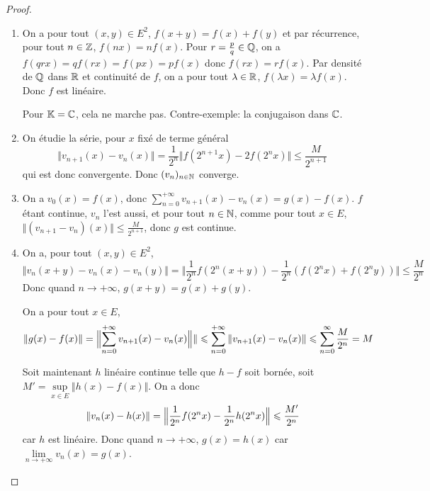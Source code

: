 \begin{proof}
	\phantom{}
	\begin{enumerate}
		\item On a pour tout $(x,y)\in E^{2}$, $f(x+y)=f(x)+f(y)$ et par récurrence, pour tout $n\in\mathbb{Z}$, $f(nx)=nf(x)$. Pour $r=\frac{p}{q}\in\mathbb{Q}$, on a $f(qrx)=qf(rx)=f(px)=pf(x)$ donc $f(rx)=rf(x)$. Par densité de $\mathbb{Q}$ dans $\mathbb{R}$ et continuité de $f$, on a pour tout $\lambda\in\mathbb{R}$, $f(\lambda x)=\lambda f(x)$. Donc $f$ est linéaire.
		
		Pour $\mathbb{K}=\mathbb{C}$, cela ne marche pas. Contre-exemple: la conjugaison dans $\mathbb{C}$.

		\item On étudie la série, pour $x$ fixé de terme général 
		\begin{equation}\Vert v_{n+1}(x)-v_{n}(x)\Vert=\frac{1}{2^{n}}\Vert f(2^{n+1}x)-2f(2^{n}x)\Vert\leqslant\frac{M}{2^{n+1}}\end{equation}
		qui est donc convergente. Donc $(v_{n})_{n\in\mathbb{N}}$ converge.

		\item On a $v_{0}(x)=f(x)$, donc $\sum_{n=0}^{+\infty}v_{n+1}(x)-v_{n}(x)=g(x)-f(x)$. $f$ étant continue, $v_{n}$ l'est aussi, et pour tout $n\in\mathbb{N}$, comme pour tout $x\in E$, $\Vert (v_{n+1}-v_{n})(x)\Vert\leqslant\frac{M}{2^{n+1}}$, donc $g$ est continue.
		
		\item On a, pour tout $(x,y)\in E^{2}$,
		\begin{equation}\Vert v_{n}(x+y)-v_{n}(x)-v_{n}(y)\Vert=\Vert \frac{1}{2^{n}}f(2^{n}(x+y))-\frac{1}{2^{n}}(f(2^{n}x)+f(2^{n}y))\Vert\leqslant\frac{M}{2^{n}}\end{equation}
		Donc quand $n\to+\infty$, $g(x+y)=g(x)+g(y)$.

		On a pour tout $x\in E$, 
		\begin{equation}\Vert g(x)-f(x)\Vert=\Bigl\lVert\sum_{n=0}^{+\infty}v_{n+1}(x)-v_{n}(x)\Bigr\Vert\rVert\leqslant\sum_{n=0}^{+\infty}\Vert v_{n+1}(x)-v_{n}(x)\Vert\leqslant\sum_{n=0}^{\infty}\frac{M}{2^{n}}=M\end{equation}

		Soit maintenant $h$ linéaire continue telle que $h-f$ soit bornée, soit $M'=\sup\limits_{x\in E}\Vert h(x)-f(x)\Vert$. On a donc 
		\begin{equation}\Vert v_{n}(x)-h(x)\Vert=\Bigl\Vert\frac{1}{2^{n}}f(2^{n}x)-\frac{1}{2^{n}}h(2^{n}x)\Bigr\Vert\leqslant\frac{M'}{2^{n}}\end{equation}
		car $h$ est linéaire. Donc quand $n\to+\infty$, $g(x)=h(x)$ car $\lim\limits_{n\to+\infty}v_{n}(x)=g(x)$.
	\end{enumerate}
\end{proof}

